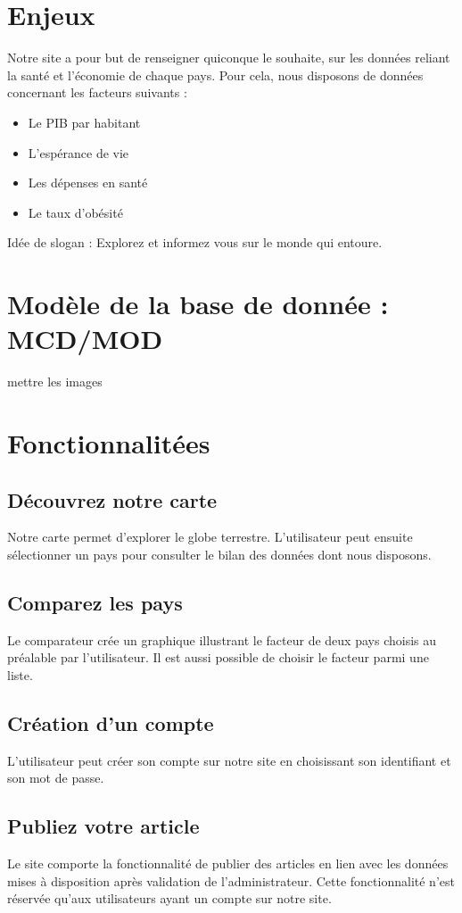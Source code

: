 \documentclass[12pt,a4paper]{report}
\begin{document}
\section{Enjeux}
	Notre site a pour but de renseigner quiconque le souhaite, sur les données reliant la santé et l'économie de chaque pays. Pour cela, nous disposons de données concernant les facteurs suivants : 
\begin{itemize}
    \item Le PIB par habitant
    \item L'espérance de vie
    \item Les dépenses en santé
    \item Le taux d'obésité
\end{itemize}	
Idée de slogan : Explorez et informez vous sur le monde qui entoure.

\section{Modèle de la base de donnée : MCD/MOD}

mettre les images
	
\section{Fonctionnalitées}
\subsection{Découvrez notre carte}
	Notre carte permet d'explorer le globe terrestre. L'utilisateur peut ensuite sélectionner un pays pour consulter le bilan des données dont nous disposons. 
\subsection{Comparez les pays}
	Le comparateur crée un graphique illustrant le facteur de deux pays choisis au préalable par l'utilisateur. Il est aussi possible de choisir le facteur parmi une liste. 
\subsection{Création d'un compte}
	L'utilisateur peut créer son compte sur notre site en choisissant son identifiant et son mot de passe. 
\subsection{Publiez votre article}
	Le site comporte la fonctionnalité de publier des articles en lien avec les données mises à disposition après validation de l'administrateur. Cette fonctionnalité n'est réservée qu'aux utilisateurs ayant un compte sur notre site.
\end{document}
